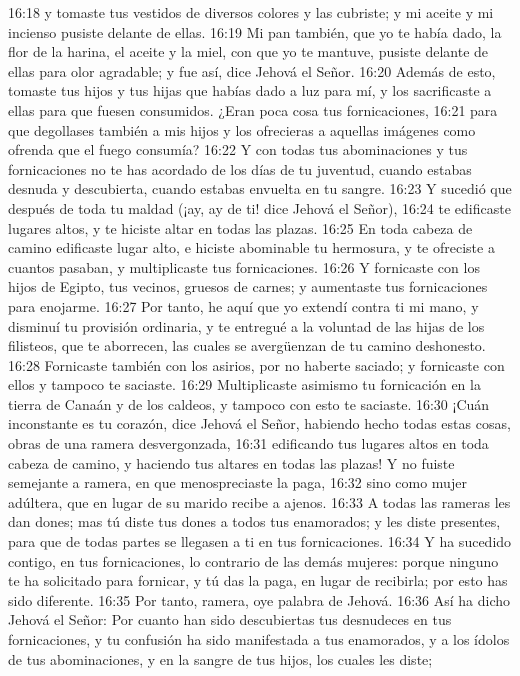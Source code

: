 16:18 y tomaste tus vestidos de diversos colores y las cubriste; y mi aceite y mi incienso pusiste delante de ellas.  
16:19 Mi pan también, que yo te había dado, la flor de la harina, el aceite y la miel, con que yo te mantuve, pusiste delante de ellas para olor agradable; y fue así, dice Jehová el Señor.  
16:20 Además de esto, tomaste tus hijos y tus hijas que habías dado a luz para mí, y los sacrificaste a ellas para que fuesen consumidos. ¿Eran poca cosa tus fornicaciones,  
16:21 para que degollases también a mis hijos y los ofrecieras a aquellas imágenes como ofrenda que el fuego consumía?  
16:22 Y con todas tus abominaciones y tus fornicaciones no te has acordado de los días de tu juventud, cuando estabas desnuda y descubierta, cuando estabas envuelta en tu sangre.  
16:23 Y sucedió que después de toda tu maldad (¡ay, ay de ti! dice Jehová el Señor),  
16:24 te edificaste lugares altos, y te hiciste altar en todas las plazas.  
16:25 En toda cabeza de camino edificaste lugar alto, e hiciste abominable tu hermosura, y te ofreciste a cuantos pasaban, y multiplicaste tus fornicaciones.  
16:26 Y fornicaste con los hijos de Egipto, tus vecinos, gruesos de carnes; y aumentaste tus fornicaciones para enojarme.  
16:27 Por tanto, he aquí que yo extendí contra ti mi mano, y disminuí tu provisión ordinaria, y te entregué a la voluntad de las hijas de los filisteos, que te aborrecen, las cuales se avergüenzan de tu camino deshonesto.  
16:28 Fornicaste también con los asirios, por no haberte saciado; y fornicaste con ellos y tampoco te saciaste.  
16:29 Multiplicaste asimismo tu fornicación en la tierra de Canaán y de los caldeos, y tampoco con esto te saciaste.  
16:30 ¡Cuán inconstante es tu corazón, dice Jehová el Señor, habiendo hecho todas estas cosas, obras de una ramera desvergonzada,  
16:31 edificando tus lugares altos en toda cabeza de camino, y haciendo tus altares en todas las plazas! Y no fuiste semejante a ramera, en que menospreciaste la paga,  
16:32 sino como mujer adúltera, que en lugar de su marido recibe a ajenos.  
16:33 A todas las rameras les dan dones; mas tú diste tus dones a todos tus enamorados; y les diste presentes, para que de todas partes se llegasen a ti en tus fornicaciones.  
16:34 Y ha sucedido contigo, en tus fornicaciones, lo contrario de las demás mujeres: porque ninguno te ha solicitado para fornicar, y tú das la paga, en lugar de recibirla; por esto has sido diferente.  
16:35 Por tanto, ramera, oye palabra de Jehová.  
16:36 Así ha dicho Jehová el Señor: Por cuanto han sido descubiertas tus desnudeces en tus fornicaciones, y tu confusión ha sido manifestada a tus enamorados, y a los ídolos de tus abominaciones, y en la sangre de tus hijos, los cuales les diste;  
